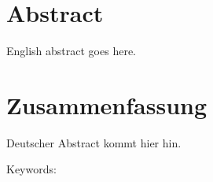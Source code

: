 \MakeShortVerb{\|}

\addchaptertocentry{\abstractname}

\section*{Abstract}

English abstract goes here.


\section*{Zusammenfassung}

Deutscher Abstract kommt hier hin.



\medskip
\noindent Keywords: \keywordnames
